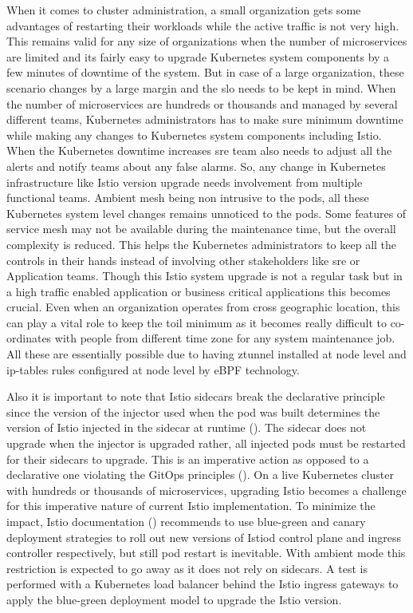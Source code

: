 When it comes to cluster administration, a small organization gets some advantages of restarting their workloads while the active traffic is not very high. This remains valid for any size of organizations when the number of microservices are limited and its fairly easy to upgrade Kubernetes system components by a few minutes of downtime of the system. But in case of a large organization, these scenario changes by a large margin and the \acrlong{slo} needs to be kept in mind. When the number of microservices are hundreds or thousands and managed by several different teams, Kubernetes administrators has to make sure minimum downtime while making any changes to Kubernetes system components including Istio. When the Kubernetes downtime increases \acrlong{sre} team also needs to adjust all the alerts and notify teams about any false alarms. So, any change in Kubernetes infrastructure like Istio version upgrade needs involvement from multiple functional teams. Ambient mesh being non intrusive to the pods, all these Kubernetes system level changes remains unnoticed to the pods. Some features of service mesh may not be available during the maintenance time, but the overall complexity is reduced. This helps the Kubernetes administrators to keep all the controls in their hands instead of involving other stakeholders like \acrshort{sre} or Application teams. Though this Istio system upgrade is not a regular task but in a high traffic enabled application or business critical applications this becomes crucial. Even when an organization operates from cross geographic location, this can play a vital  role to keep the toil minimum as it becomes really difficult to co-ordinates with people from different time zone for any system maintenance job. All these are essentially possible due to having ztunnel installed at node level and ip-tables rules configured at node level by eBPF technology.

Also it is important to note that Istio sidecars break the declarative principle since the version of the injector used when the pod was built determines the version of Istio injected in the sidecar at runtime (\cite{gitMitch2023}). The sidecar does not upgrade when the injector is upgraded rather, all injected pods must be restarted for their sidecars to upgrade. This is an imperative action as opposed to a declarative one violating the GitOps principles (\cite{gitopsBook}). On a live Kubernetes cluster with hundreds or thousands of microservices, upgrading Istio becomes a challenge for this imperative nature of current Istio implementation. To minimize the impact, Istio documentation (\cite{istioDocCanaryUpgrade}) recommends to use blue-green and canary deployment strategies to roll out new versions of Istiod control plane and ingress controller respectively, but still pod restart is inevitable. With ambient mode this restriction is expected to go away as it does not rely on sidecars. A test is performed with a Kubernetes load balancer behind the Istio ingress gateways to apply the blue-green deployment model to upgrade the Istio version.
